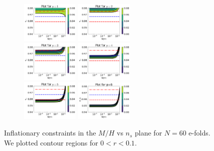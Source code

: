 \documentclass[amssymb,twocolumn,prd,nofootinbib,showpacs]{revtex4-1}
\begin{document}
\begin{figure}[h!]
\begin{subfigure}[b]{0.6\textwidth}
\includegraphics[width=0.3\textwidth]{p160.png}
\includegraphics[width=0.3\textwidth]{p260.png}\\ \includegraphics[width=0.3\textwidth]{p360.png}
\includegraphics[width=0.3\textwidth]{p460.png}\\
\includegraphics[width=0.3\textwidth]{p560.png}
\includegraphics[width=0.3\textwidth]{p660.png}
\label{curv60}
\end{subfigure}
\caption{Inflationary constraints in the $M/H$ vs $n_s$ plane for $N=60$ e-folds. We plotted contour regions for $0<r<0.1$.}
\end{figure}
\end{document}
